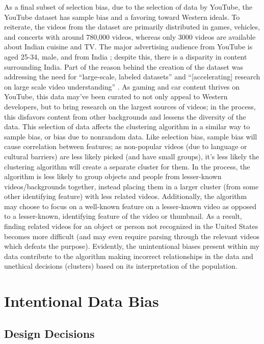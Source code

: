 \documentclass[10pt,twocolumn]{article}
\begin{document}
As a final subset of selection bias, due to the selection of data by YouTube, the YouTube dataset has sample bias and a favoring toward Western ideals. To reiterate, the videos from the dataset are primarily distributed in games, vehicles, and concerts with around 780,000 videos, whereas only 3000 videos are available about Indian cuisine and TV. The major advertising audience from YouTube is aged 25-34, male, and from India \cite{HootSuite2022}; despite this, there is a disparity in content surrounding India. Part of the reason behind the creation of the dataset was addressing the need for “large-scale, labeled datasets” and “[accelerating] research on large scale video understanding” \cite{Warrick2020}. As gaming and car content thrives on YouTube, this data may’ve been curated to not only appeal to Western developers, but to bring research on the largest sources of videos; in the process, this disfavors content from other backgrounds and lessens the diversity of the data. This selection of data affects the clustering algorithm in a similar way to sample bias, or bias due to nonrandom data. Like selection bias, sample bias will cause correlation between features; as non-popular videos (due to language or cultural barriers) are less likely picked (and have small groups), it’s less likely the clustering algorithm will create a separate cluster for them. In the process, the algorithm is less likely to group objects and people from lesser-known videos/backgrounds together, instead placing them in a larger cluster (from some other identifying feature) with less related videos. Additionally, the algorithm may choose to focus on a well-known feature on a lesser-known video as opposed to a lesser-known, identifying feature of the video or thumbnail. As a result, finding related videos for an object or person not recognized in the United States becomes more difficult (and may even require parsing through the relevant videos which defeats the purpose). Evidently, the unintentional biases present within my data contribute to the algorithm making incorrect relationships in the data and unethical decisions (clusters) based on its interpretation of the population.

\section {Intentional Data Bias}

\subsection {Design Decisions}
\end{document}

